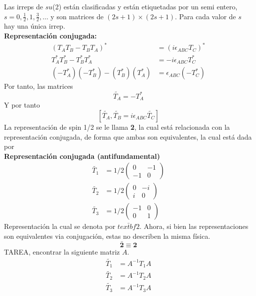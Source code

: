 Las irreps de $su$(2) están clasificadas y están etiquetadas por un semi entero, $s=0,\frac{1}{2}, 1 , \frac{3}{2},\dots$ y son matrices de $(2s+1)\times (2s+1)$. Para cada valor de $s$ hay una única irrep. \\
\textbf{Representación conjugada:}
\begin{align*}
  (T_AT_B - T_BT_A)^* & = (i\epsilon_{ABC}T_C)^* \\
  T_A^*T_B^*-T_B^*T_A^* & = -i\epsilon_{ABC}T_C^* \\
  (-T_A^*)(-T_B^*) - (T_B^*)(T_A^*) & = \epsilon_{ABC}(-T_C^*)
\end{align*}
Por tanto, las matrices 
\begin{equation*}
  \tilde{T_A} = -T_A^*
\end{equation*}
Y por tanto
\begin{equation*}
  \left[\tilde{T_A},\tilde{T_B} = i\epsilon_{ABC}\tilde{T_C}\right]
\end{equation*}
La representación de spin 1/2 se le llama \textbf{2}, la cual está relacionada con la representación conjugada, de forma que ambas son equivalentes, la cual está dada por\\
\textbf{Representación conjugada (antifundamental)}
\begin{align*}
  \tilde{T_1} & = 1/2\begin{pmatrix} 0 & -1 \\ -1 & 0 \end{pmatrix} \\
  \tilde{T_2} & = 1/2\begin{pmatrix} 0 & -i \\ i & 0 \end{pmatrix}\\
    \tilde{T_3} & = 1/2 \begin{pmatrix} -1 & 0 \\ 0 & 1 \end{pmatrix}
\end{align*}
Representación la cual se denota por $\bar{textbf{2}}$. Ahora, si bien las representaciones son equivalentes via conjugación, estas no describen la misma física.
\begin{equation*}
  \bar{\textbf{2}} \equiv \textbf{2}
\end{equation*}
TAREA, encontrar la siguiente matriz $A$. 
\begin{align*}
  \tilde{T_1} & = A^{-1}T_1A \\
  \tilde{T_2} & = A^{-1}T_2A \\
  \tilde{T_3} & = A^{-1}T_3A
\end{align*}
